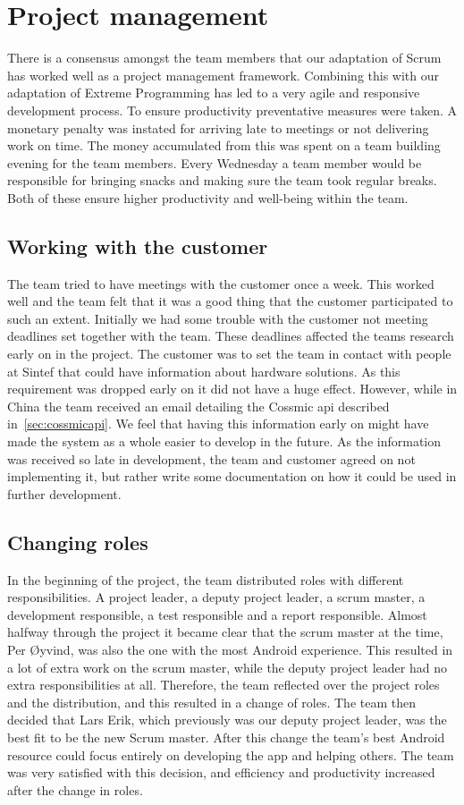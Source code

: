 \section{Project management}
There is a consensus amongst the team members that our adaptation of Scrum has worked well as a project management framework. Combining this with our adaptation of Extreme Programming has led to a very agile and responsive development process. To ensure productivity preventative measures were taken. A monetary penalty was instated for arriving late to meetings or not delivering work on time. The money accumulated from this was spent on a team building evening for the team members. Every Wednesday a team member would be responsible for bringing snacks and making sure the team took regular breaks. Both of these ensure higher productivity and well-being within the team.

\subsection{Working with the customer}
The team tried to have meetings with the customer once a week. This worked well and the team felt that it was a good thing that the customer participated to such an extent. Initially we had some trouble with the customer not meeting deadlines set together with the team. These deadlines affected the teams research early on in the project. The customer was to set the team in contact with people at Sintef that could have information about hardware solutions. As this requirement was dropped early on it did not have a huge effect. However, while in China the team received an email detailing the Cossmic api described in~\ref{sec:cossmicapi}. We feel that having this information early on might have made the system as a whole easier to develop in the future. As the information was received so late in development, the team and customer agreed on not implementing it, but rather write some documentation on how it could be used in further development.

\subsection{Changing roles}
\label{sec:unbalancedWorkload}
In the beginning of the project, the team distributed roles with different responsibilities. A project leader, a deputy project leader, a scrum master, a development responsible, a test responsible and a report responsible. Almost halfway through the project it became clear that the scrum master at the time, Per Øyvind, was also the one with the most Android experience. This resulted in a lot of extra work on the scrum master, while the deputy project leader had no extra responsibilities at all. Therefore, the team reflected over the project roles and the distribution, and this resulted in a change of roles. The team then decided that Lars Erik, which previously was our deputy project leader, was the best fit to be the new Scrum master. After this change the team's best Android resource could focus entirely on developing the app and helping others. The team was very satisfied with this decision, and efficiency and productivity increased after the change in roles.


